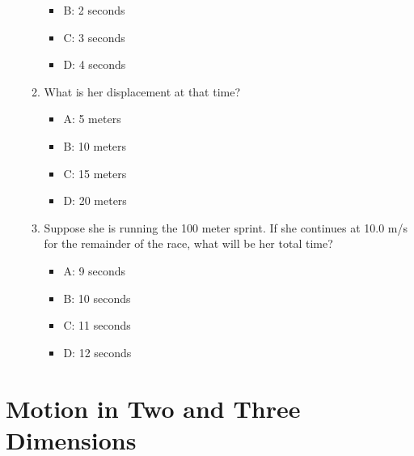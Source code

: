 \documentclass[10pt]{article}
\begin{document}
\begin{enumerate}
\begin{enumerate}
\begin{itemize}
\item B: 2 seconds
\item C: 3 seconds
\item D: 4 seconds
\end{itemize}
\item What is her displacement at that time?
\begin{itemize}
\item A: 5 meters
\item B: 10 meters
\item C: 15 meters
\item D: 20 meters
\end{itemize}
\item Suppose she is running the 100 meter sprint.  If she continues at 10.0 m/s for the remainder of the race, what will be her total time?
\begin{itemize}
\item A: 9 seconds
\item B: 10 seconds
\item C: 11 seconds
\item D: 12 seconds
\end{itemize}
\end{enumerate}
\end{enumerate}

\section{Motion in Two and Three Dimensions}
\end{document}
